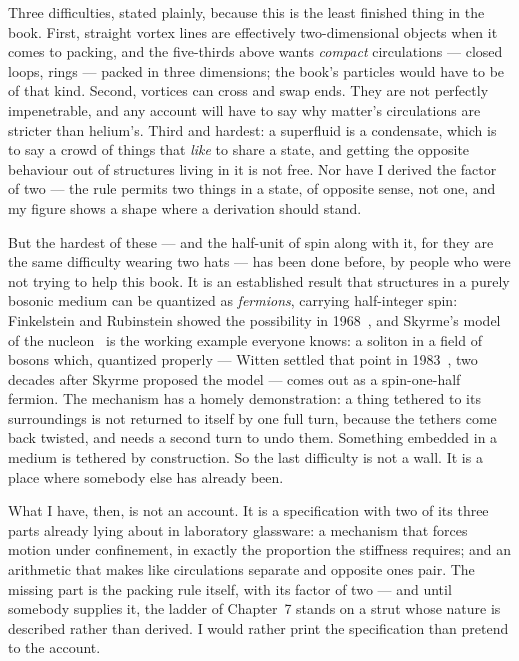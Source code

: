 \documentclass[fontsize=11pt,paper=a4,pagesize=auto,parskip=half-]{scrbook}
\begin{document}
Three difficulties, stated plainly, because this is the least finished thing in the book. First, straight vortex lines are effectively two-dimensional objects when it comes to packing, and the five-thirds above wants \emph{compact} circulations --- closed loops, rings --- packed in three dimensions; the book's particles would have to be of that kind. Second, vortices can cross and swap ends. They are not perfectly impenetrable, and any account will have to say why matter's circulations are stricter than helium's. Third and hardest: a superfluid is a condensate, which is to say a crowd of things that \emph{like} to share a state, and getting the opposite behaviour out of structures living in it is not free. Nor have I derived the factor of two --- the rule permits two things in a state, of opposite sense, not one, and my figure shows a shape where a derivation should stand.

But the hardest of these --- and the half-unit of spin along with it, for they are the same difficulty wearing two hats --- has been done before, by people who were not trying to help this book. It is an established result that structures in a purely bosonic medium can be quantized as \emph{fermions}, carrying half-integer spin: Finkelstein and Rubinstein showed the possibility in 1968~\cite{finkelstein1968}, and Skyrme's model of the nucleon~\cite{skyrme1962} is the working example everyone knows: a soliton in a field of bosons which, quantized properly --- Witten settled that point in 1983~\cite{witten1983}, two decades after Skyrme proposed the model --- comes out as a spin-one-half fermion. The mechanism has a homely demonstration: a thing tethered to its surroundings is not returned to itself by one full turn, because the tethers come back twisted, and needs a second turn to undo them. Something embedded in a medium is tethered by construction. So the last difficulty is not a wall. It is a place where somebody else has already been.

What I have, then, is not an account. It is a specification with two of its three parts already lying about in laboratory glassware: a mechanism that forces motion under confinement, in exactly the proportion the stiffness requires; and an arithmetic that makes like circulations separate and opposite ones pair. The missing part is the packing rule itself, with its factor of two --- and until somebody supplies it, the ladder of Chapter~7 stands on a strut whose nature is described rather than derived. I would rather print the specification than pretend to the account.
\end{document}
